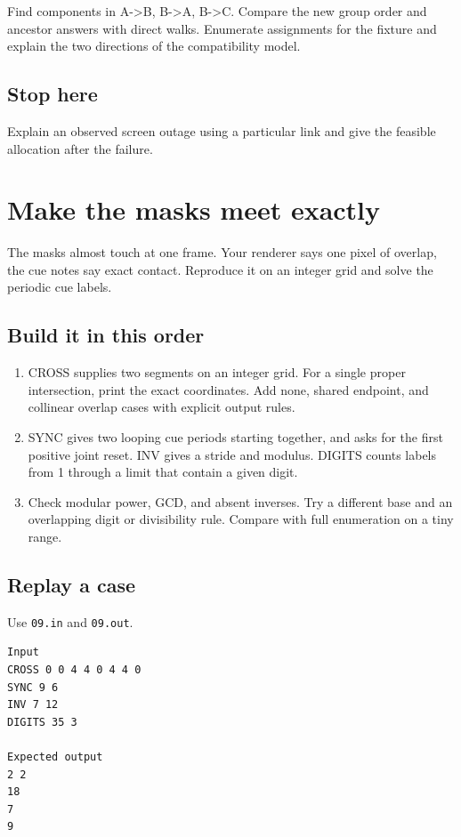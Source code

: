 \documentclass[11pt,letterpaper]{article}
\begin{document}
Find components in A->B, B->A, B->C. Compare the new group order and ancestor answers with direct walks. Enumerate assignments for the fixture and explain the two directions of the compatibility model.

\subsection*{Stop here}

Explain an observed screen outage using a particular link and give the feasible allocation after the failure.

\clearpage

\section{Make the masks meet exactly}\label{visuals:09}

The masks almost touch at one frame. Your renderer says one pixel of overlap, the cue notes say exact contact. Reproduce it on an integer grid and solve the periodic cue labels.

\subsection*{Build it in this order}

\begin{enumerate}
\item CROSS supplies two segments on an integer grid. For a single proper intersection, print the exact coordinates. Add none, shared endpoint, and collinear overlap cases with explicit output rules.
\item SYNC gives two looping cue periods starting together, and asks for the first positive joint reset. INV gives a stride and modulus. DIGITS counts labels from 1 through a limit that contain a given digit.
\item Check modular power, GCD, and absent inverses. Try a different base and an overlapping digit or divisibility rule. Compare with full enumeration on a tiny range.
\end{enumerate}

\subsection*{Replay a case}

Use \texttt{09.in} and \texttt{09.out}.

\begin{samepage}
\small
\begin{verbatim}
Input
CROSS 0 0 4 4 0 4 4 0
SYNC 9 6
INV 7 12
DIGITS 35 3

Expected output
2 2
18
7
9
\end{verbatim}
\end{samepage}
\end{document}
